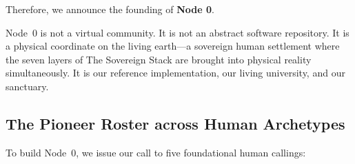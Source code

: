 Therefore, we announce the founding of \textbf{Node 0}.

Node~0 is not a virtual community. It is not an abstract software repository. It is a physical coordinate on the living earth---a sovereign human settlement where the seven layers of The Sovereign Stack are brought into physical reality simultaneously. It is our reference implementation, our living university, and our sanctuary.

\subsection{The Pioneer Roster across Human Archetypes}
\label{subsec:pioneer_roster}

To build Node~0, we issue our call to five foundational human callings:

